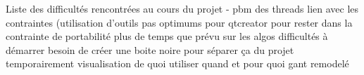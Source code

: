 Liste des difficultés rencontrées au cours du projet
- pbm des threads
lien avec les contraintes (utilisation d'outils pas optimums pour qtcreator pour rester dans la contrainte de portabilité
plus de temps que prévu sur les algos
difficultés à démarrer
besoin de créer une boite noire pour séparer ça du projet temporairement
visualisation de quoi utiliser quand et pour quoi
gant remodelé

\paragraph{}
